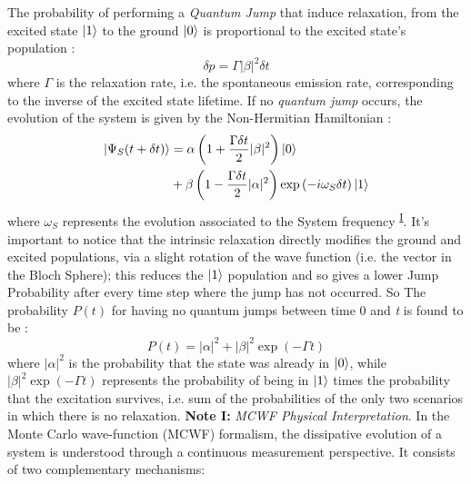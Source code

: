\documentclass[a4paper,12pt]{article}
\begin{document}
	The probability of performing a \textit{Quantum Jump} that induce relaxation, from the excited state $ \ket{1} $ to the ground $ \ket{0} $ is proportional to the excited state's population : 
	\begin{equation}
		\delta p = \Gamma | \beta |^{2} \delta t
	\end{equation}
	where $ \Gamma $ is the relaxation rate, i.e. the spontaneous emission rate, corresponding to the inverse of the excited state lifetime. \newline
	If no \textit{quantum jump} occurs, the evolution of the system is given by the Non-Hermitian Hamiltonian : 
	\begin{align}
		\ket{\Psi_{S} (t + \delta t)} &= \alpha \left( 1 + \frac{\Gamma \delta t}{2} | \beta |^{2} \right) \ket{0} \notag \\
			&+ \beta \left(1 - \frac{\Gamma \delta t}{2} | \alpha |^{2} \right) \exp{\left( -i \omega_{S} \delta t \right)} \ket{1}
	\end{align}
	where $ \omega_{S} $ represents the evolution associated to the System frequency \textsuperscript{\hyperlink{noteI}{I}}. \newline 
	It's important to notice that the intrinsic relaxation directly modifies the ground and excited populations, via a slight rotation of the wave function (i.e. the vector in the Bloch Sphere); this reduces the $ \ket{1} $ population and so gives a lower Jump Probability after every time step where the jump has not occurred. So The probability $ P(t) $ for having no quantum jumps between time 0 and \textit{t} is found to be : 
	\begin{equation}
		P (t) = |\alpha|^{2} + |\beta|^{2} \exp{\left( - \Gamma t \right)}
	\end{equation}
	where $ |\alpha|^{2} $ is the probability that the state was already in $ \ket{0} $, while $ |\beta|^{2} \exp{\left( - \Gamma t \right)} $ represents the probability of being in $ \ket{1} $ times the probability that the excitation survives, i.e. sum of the probabilities of the only two scenarios in which there is no relaxation.
	\newline
	\newline
	\hypertarget{noteI}{\textbf{Note I:} \textit{MCWF Physical Interpretation}.} \newline
	In the Monte Carlo wave-function (MCWF) formalism, the dissipative evolution of a system is understood through a continuous measurement perspective. It consists of two complementary mechanisms:
\end{document}
